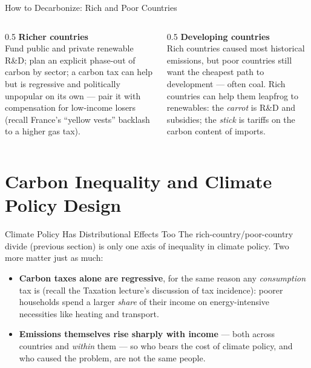 \documentclass[11pt,aspectratio=169]{beamer}
\begin{document}
\begin{frame}{How to Decarbonize: Rich and Poor Countries}
  \begin{columns}[T]
    \begin{column}{0.5\textwidth}
      \textbf{Richer countries}\\
      \small Fund public and private renewable R\&D; plan an explicit phase-out of carbon by sector; a carbon tax can help but is regressive and politically unpopular on its own --- pair it with compensation for low-income losers (recall France's ``yellow vests'' backlash to a higher gas tax).
    \end{column}
    \begin{column}{0.5\textwidth}
      \textbf{Developing countries}\\
      \small Rich countries caused most historical emissions, but poor countries still want the cheapest path to development --- often coal. Rich countries can help them leapfrog to renewables: the \emph{carrot} is R\&D and subsidies; the \emph{stick} is tariffs on the carbon content of imports.
    \end{column}
  \end{columns}
\end{frame}

\section{Carbon Inequality and Climate Policy Design}

\begin{frame}{Climate Policy Has Distributional Effects Too}
  \small
  The rich-country/poor-country divide (previous section) is only one axis of inequality in climate policy. Two more matter just as much:
  \begin{itemize}
    \item \textbf{Carbon taxes alone are regressive}, for the same reason any \emph{consumption} tax is (recall the Taxation lecture's discussion of tax incidence): poorer households spend a larger \emph{share} of their income on energy-intensive necessities like heating and transport.
    \item \textbf{Emissions themselves rise sharply with income} --- both across countries and \emph{within} them --- so who bears the cost of climate policy, and who caused the problem, are not the same people.
  \end{itemize}
\end{frame}
\end{document}
